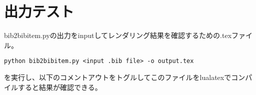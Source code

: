 \documentclass{ltjsarticle}
\begin{document}
\section{出力テスト}

bib2bibitem.pyの出力をinputしてレンダリング結果を確認するための.texファイル。
\begin{lstlisting}[basicstyle=\ttfamily]
    python bib2bibitem.py <input .bib file> -o output.tex
\end{lstlisting}
を実行し、以下のコメントアウトをトグルしてこのファイルをlualatexでコンパイルすると結果が確認できる。

\begin{thebibliography}{99} 


%

\end{thebibliography}
\end{document}
